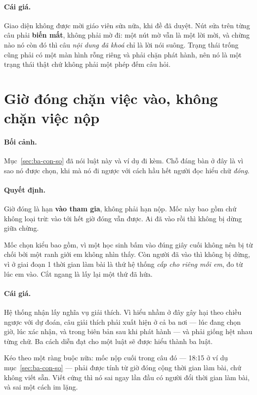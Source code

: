\paragraph{Cái giá.} Giao diện không được mời giáo viên sửa nữa, khi đề đã duyệt. Nút sửa trên từng
câu phải \textbf{biến mất}, không phải mờ đi: một nút mờ vẫn là một lời mời, và chừng nào nó còn
đó thì câu \emph{nội dung đã khoá} chỉ là lời nói suông. Trạng thái trống cũng phải có một màn
hình rỗng riêng và phải chặn phát hành, nên nó là một trạng thái thật chứ không phải một phép
đếm câu hỏi.

\section{Giờ đóng chặn việc vào, không chặn việc nộp}

\paragraph{Bối cảnh.} Mục~\ref{sec:ba-con-so} đã nói luật này và ví dụ đi kèm. Chỗ đáng bàn ở
đây là vì sao nó được chọn, khi mà nó đi ngược với cách hầu hết người đọc hiểu chữ \emph{đóng}.

\paragraph{Quyết định.} Giờ đóng là hạn \textbf{vào tham gia}, không phải hạn nộp. Mốc này bao
gồm chứ không loại trừ: vào tới hết giờ đóng vẫn được. Ai đã vào rồi thì không bị dừng giữa
chừng.

Mốc chọn kiểu bao gồm, vì một học sinh bấm vào đúng giây cuối không nên bị từ chối bởi một ranh
giới em không nhìn thấy. Còn người đã vào thì không bị dừng, vì ở giai đoạn 1 thời gian làm bài
là thứ hệ thống \emph{cấp cho riêng mỗi em}, đo từ lúc em vào. Cắt ngang là lấy lại một thứ đã
hứa.

\paragraph{Cái giá.} Hệ thống nhận lấy nghĩa vụ giải thích. Vì hiểu nhầm ở đây gây hại theo
chiều ngược với dự đoán, câu giải thích phải xuất hiện ở cả ba nơi --- lúc đang chọn giờ, lúc xác
nhận, và trong biên bản sau khi phát hành --- và phải giống hệt nhau từng chữ. Ba cách diễn đạt
cho một luật sẽ được hiểu thành ba luật.

Kéo theo một ràng buộc nữa: mốc nộp cuối trong câu đó --- 18:15 ở ví dụ
mục~\ref{sec:ba-con-so} --- phải được tính từ giờ đóng cộng thời gian làm bài, chứ không viết
sẵn. Viết cứng thì nó sai ngay lần đầu có người đổi thời gian làm bài, và sai một cách im lặng.

